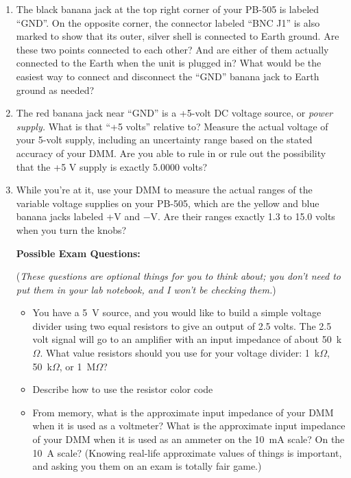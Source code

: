 \begin{enumerate}
\pagebreak[3]
\item The black banana jack at the top right corner of your \mbox{PB-505}  is labeled ``GND''.  On the opposite corner, the connector labeled ``BNC J1'' is also marked to show that its outer, silver shell is connected to Earth ground.  Are these two points connected to each other?  And are either of them actually connected to the Earth when the unit is plugged in?  What would be the easiest way to connect and disconnect the ``GND'' banana jack to Earth ground as needed?

\item The red banana jack near ``GND'' is a +5-volt DC voltage source, or \textit{power supply.}  What is that ``+5 volts'' relative to?  Measure the actual voltage of your 5-volt supply, including an uncertainty range based on the stated accuracy of your DMM.  Are you able to rule in or rule out the possibility that the +5 V supply is exactly 5.0000 volts?  

\item While you're at it, use your DMM to measure the actual ranges of the variable voltage supplies on your \mbox{PB-505}, which are the yellow and blue banana jacks labeled +V and $-$V.  Are their ranges exactly 1.3 to 15.0 volts when you turn the knobs?

\vfill
\bigskip\bigskip
\textbf{Possible Exam Questions:}

(\textit{These questions are optional things for you to think about; you don't need to put them in your lab notebook, and I won't be checking them.})

\begin{itemize}
\item You have a 5~V source, and you would like to build a simple voltage divider using two equal resistors to give an output of 2.5 volts.  The 2.5 volt signal will go to an amplifier with an input impedance of about 50~k$\Omega$.  What value resistors should you use for your voltage divider: 1~k$\Omega$, 50~k$\Omega$, or 1~M$\Omega$?

\item Describe how to use the resistor color code

\item From memory, what is the approximate input impedance of your DMM when it is used as a voltmeter?  What is the approximate input impedance of your DMM when it is used as an ammeter on the 10~mA scale?  On the 10~A scale?  (Knowing real-life approximate values of things is important, and asking you them on an exam is totally fair game.)


\end{itemize}
\end{enumerate}

